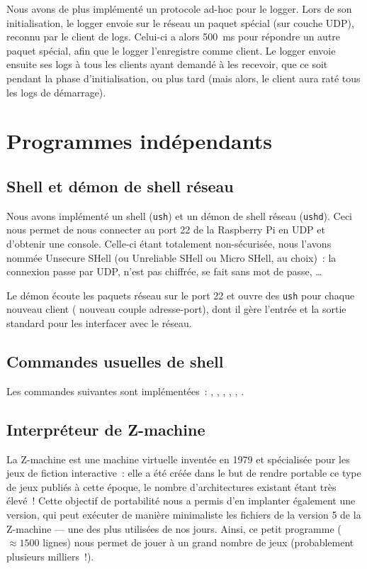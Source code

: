 \documentclass[11pt,a4paper]{article}
\newcommand{\fname}[1]{\texttt{#1}} %
\begin{document}
Nous avons de plus implémenté un protocole ad-hoc pour le logger.
Lors de son initialisation, le logger envoie sur le réseau un paquet spécial
(sur couche UDP), reconnu par le client de logs. Celui-ci a alors 500\ ms pour
répondre un autre paquet spécial, afin que le logger l'enregistre comme
client. Le logger envoie ensuite ses logs à tous les clients ayant demandé à
les recevoir, que ce soit pendant la phase d'initialisation, ou plus tard
(mais alors, le client aura raté tous les logs de démarrage).

\section{Programmes indépendants}

\subsection{Shell et démon de shell réseau}
Nous avons implémenté un shell (\fname{ush}) et un démon de shell réseau
(\fname{ushd}). Ceci nous permet de nous connecter au port 22 de la
Raspberry Pi en UDP et d'obtenir une console. Celle-ci étant totalement
non-sécurisée, nous l'avons nommée Unsecure SHell (ou Unreliable SHell ou
Micro SHell, au choix)~: la connexion passe par UDP,
n'est pas chiffrée, se fait sans mot de passe, \ldots

Le démon écoute les paquets réseau sur le port 22 et ouvre des \fname{ush}
pour chaque nouveau client (\ie{} nouveau couple adresse-port), dont il gère
l'entrée et la sortie standard pour les interfacer avec le réseau.

\subsection{Commandes usuelles de shell}
Les commandes suivantes sont implémentées~:
, , , , , .

\subsection{Interpréteur de Z-machine}
La Z-machine est une machine virtuelle inventée en 1979 et spécialisée
pour les jeux de fiction interactive~: elle a été créée dans le but de
rendre portable ce type de jeux publiés à cette époque, le nombre
d'architectures existant étant très élevé~! Cette objectif de
portabilité nous a permis d'en implanter également une version, qui
peut exécuter de manière minimaliste les fichiers de la version 5 de
la Z-machine --- une des plus utilisées de nos jours. Ainsi, ce petit
programme ($\approx 1500$ lignes) nous permet de jouer à un grand
nombre de jeux (probablement plusieurs milliers~!).
\end{document}
